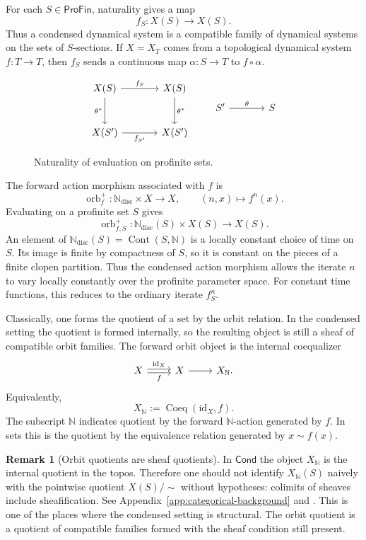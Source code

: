 \documentclass[10pt]{amsart}
\newcommand{\ProFin}{\mathsf{ProFin}}
\newcommand{\Cond}{\mathsf{Cond}}
\newcommand{\Coeq}{\operatorname{Coeq}}
\newcommand{\Cont}{\operatorname{Cont}}
\newcommand{\N}{\mathbb{N}}
\newcommand{\Ndisc}{\mathbb{N}_{\mathrm{disc}}}
\theoremstyle{plain}
\theoremstyle{definition}
\newtheorem{remark}[theorem]{Remark}
\begin{document}
For each $S\in\ProFin$, naturality gives a map
\[
  f_S:X(S)\to X(S).
\]
Thus a condensed dynamical system is a compatible family of dynamical systems
on the sets of $S$-sections. If $X=X_T$ comes from a topological dynamical
system $f:T\to T$, then $f_S$ sends a continuous map $\alpha:S\to T$ to
$f\circ\alpha$.

\begin{figure}[htbp]
\centering
\[
\begin{tikzcd}[column sep=large, row sep=large]
X(S) \arrow[r, "f_S"] \arrow[d, "\theta^\ast"'] &
X(S) \arrow[d, "\theta^\ast"]\\
X(S') \arrow[r, "f_{S'}"'] &
X(S')
\end{tikzcd}
\qquad
\begin{tikzcd}[column sep=large]
S' \arrow[r, "\theta"] & S
\end{tikzcd}
\]
\caption{Naturality of evaluation on profinite sets.}
\label{fig:evaluation-natural}
\end{figure}

The forward action morphism associated with $f$ is
\[
  \operatorname{orb}^+_f:\Ndisc\times X\longrightarrow X,
  \qquad
  (n,x)\longmapsto f^n(x).
\]
Evaluating on a profinite set $S$ gives
\[
  \operatorname{orb}^+_{f,S}:
  \Ndisc(S)\times X(S)\longrightarrow X(S).
\]
An element of
$\Ndisc(S)=\Cont(S,\N)$ is a locally constant choice of time on $S$. Its image is
finite by compactness of $S$, so it is constant on the pieces of a finite clopen
partition. Thus the condensed action morphism allows the iterate $n$ to vary
locally constantly over the profinite parameter space. For constant time
functions, this reduces to the ordinary iterate $f_S^n$.

Classically, one forms the quotient of a set by the orbit relation. In the
condensed setting the quotient is formed internally, so the resulting object is
still a sheaf of compatible orbit families. The forward orbit object is the
internal
coequalizer
\[
\begin{tikzcd}
X \arrow[r, shift left=0.45ex, "\mathrm{id}_X"]
  \arrow[r, shift right=0.45ex, swap, "f"] &
X \arrow[r] &
X_{\N}.
\end{tikzcd}
\]
Equivalently,
\[
  X_{\N}:=\Coeq(\mathrm{id}_X,f).
\]
The subscript $\N$ indicates quotient by the forward $\N$-action generated by
$f$.
In sets this is the quotient by the equivalence relation generated by
$x\sim f(x)$.

\begin{remark}[Orbit quotients are sheaf quotients]
In $\Cond$ the object $X_{\N}$ is the internal quotient in the topos. Therefore
one should not identify $X_{\N}(S)$ naively with the pointwise quotient
$X(S)/{\sim}$ without hypotheses: colimits of sheaves include sheafification.
See Appendix~\ref{app:categorical-background} and
\cite{MacLaneMoerdijk,JohnstoneTopos}. This is one of the places where the
condensed setting is structural. The orbit quotient is a quotient of compatible
families formed with the sheaf condition still present.
\end{remark}
\end{document}

